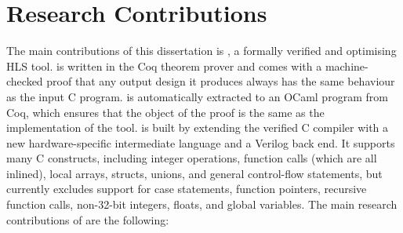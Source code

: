 \section{Research Contributions}%
\label{sec:intro:research-contributions}

The main contributions of this dissertation is \vericert{}, a formally verified
and optimising \gls{HLS} tool.  \vericert{} is written in the Coq theorem prover
and comes with a machine-checked proof that any output design it produces always
has the same behaviour as the input C program.  \vericert{} is automatically
extracted to an OCaml program from Coq, which ensures that the object of the
proof is the same as the implementation of the tool.  \vericert{} is built by
extending the \compcert{} verified C compiler with a new hardware-specific
intermediate language and a Verilog back end.  It supports many C constructs,
including integer operations, function calls (which are all inlined), local
arrays, structs, unions, and general control-flow statements, but currently
excludes support for case statements, function pointers, recursive function
calls, non-32-bit integers, floats, and global variables.  The main research
contributions of \vericert{} are the following:


